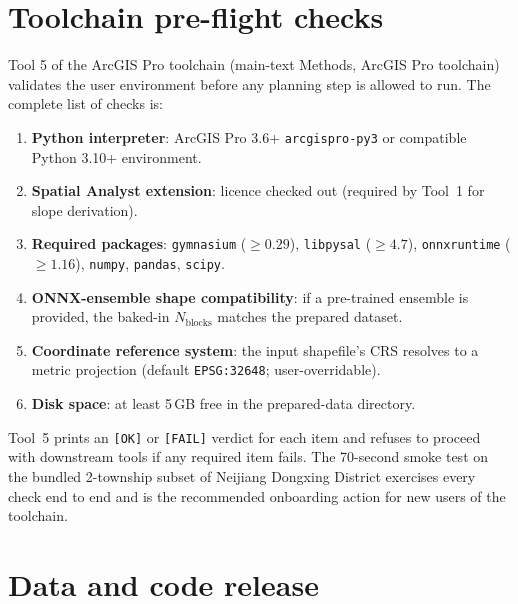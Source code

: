 \documentclass[11pt]{article}
\begin{document}
\section{Toolchain pre-flight checks}\label{si:s4-toolchain}

Tool 5 of the ArcGIS Pro toolchain (main-text Methods, ArcGIS Pro toolchain) validates the user environment before any planning step is allowed to run. The complete list of checks is:

\begin{enumerate}
\item \textbf{Python interpreter}: ArcGIS Pro 3.6+ \texttt{arcgispro-py3} or compatible Python 3.10+ environment.
\item \textbf{Spatial Analyst extension}: licence checked out (required by Tool~1 for slope derivation).
\item \textbf{Required packages}: \texttt{gymnasium} ($\geq 0.29$), \texttt{libpysal} ($\geq 4.7$), \texttt{onnxruntime} ($\geq 1.16$), \texttt{numpy}, \texttt{pandas}, \texttt{scipy}.
\item \textbf{ONNX-ensemble shape compatibility}: if a pre-trained ensemble is provided, the baked-in $N_{\text{blocks}}$ matches the prepared dataset.
\item \textbf{Coordinate reference system}: the input shapefile's CRS resolves to a metric projection (default \texttt{EPSG:32648}; user-overridable).
\item \textbf{Disk space}: at least 5\,GB free in the prepared-data directory.
\end{enumerate}

Tool~5 prints an \texttt{[OK]} or \texttt{[FAIL]} verdict for each item and refuses to proceed with downstream tools if any required item fails. The 70-second smoke test on the bundled 2-township subset of Neijiang Dongxing District exercises every check end to end and is the recommended onboarding action for new users of the toolchain.

\section{Data and code release}\label{si:s5-release}
\end{document}
